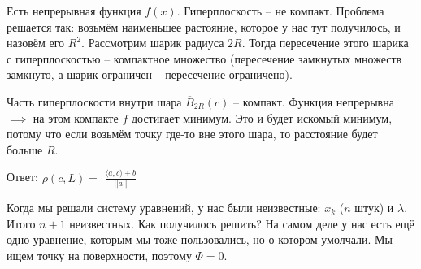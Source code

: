 \begin{example}
    Есть непрерывная функция $f(x)$. Гиперплоскость -- не компакт. Проблема решается так: возьмём наименьшее растояние, которое у нас тут получилось, и назовём его $R^2$. Рассмотрим шарик радиуса $2R$. Тогда пересечение этого шарика с гиперплоскостью -- компактное множество (пересечение замкнутых множеств замкнуто, а шарик ограничен -- пересечение ограничено). 
    
    Часть гиперплоскости внутри шара $\overline{B}_{2R}(c)$ -- компакт. Функция непрерывна $\implies$ на этом компакте $f$ достигает минимум. Это и будет искомый минимум, потому что если возьмём точку где-то вне этого шара, то расстояние будет больше $R$.
    
    Ответ: $\rho(c, L) =$ \large $\frac{\langle a, c \rangle + b}{||a||}$ \normalsize
    
    \begin{remark} \thmslashn
    	
    	Когда мы решали систему уравнений, у нас были неизвестные: $x_k$ ($n$ штук) и $\lambda$. Итого $n + 1$ неизвестных. Как получилось решить? На самом деле у нас есть ещё одно уравнение, которым мы тоже пользовались, но о котором умолчали. Мы ищем точку на поверхности, поэтому $\Phi = 0$.
    	
    \end{remark}
    
\end{example} 

